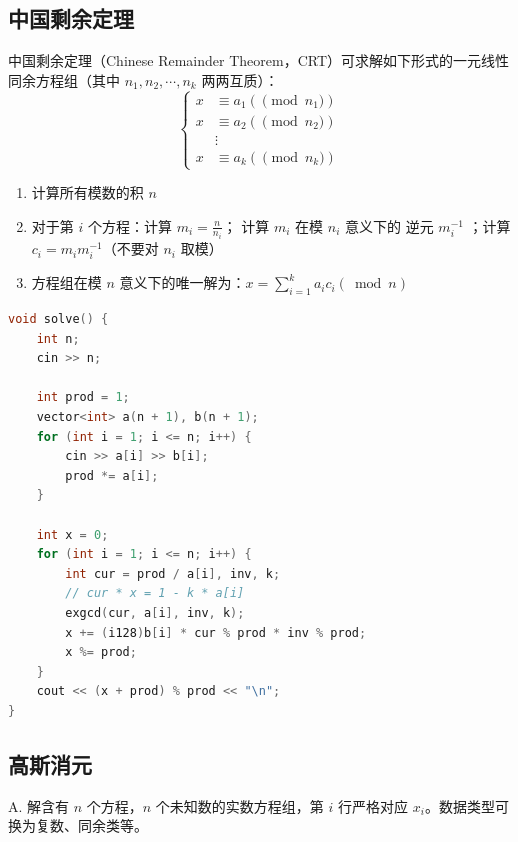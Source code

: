 \subsection{中国剩余定理}

中国剩余定理（Chinese Remainder Theorem，CRT）可求解如下形式的一元线性同余方程组（其中 $n_1, n_2, \cdots, n_k$ 两两互质）：
$$
\left\{\begin{aligned}
x & \equiv a_1\left(\pmod n_1\right) \\
x & \equiv a_2\left(\pmod n_2\right) \\
& \vdots \\
x & \equiv a_k\left(\pmod n_k\right)
\end{aligned}\right.
$$

\begin{enumerate}
    \item 计算所有模数的积 $n$ 
    \item 对于第 $i$ 个方程：计算 $m_i=\frac{n}{n_i}$； 计算 $m_i$ 在模 $n_i$ 意义下的 逆元 $m_i^{-1}$ ；计算 $c_i=m_i m_i^{-1}$（不要对 $n_i$ 取模）
    \item 方程组在模 $n$ 意义下的唯一解为：$x=\sum_{i=1}^k a_i c_i(\bmod n)$
\end{enumerate}

\begin{lstlisting}[language=C++]
void solve() {
    int n;
    cin >> n;
    
    int prod = 1;
    vector<int> a(n + 1), b(n + 1);
    for (int i = 1; i <= n; i++) {
        cin >> a[i] >> b[i];
        prod *= a[i];
    }

    int x = 0;
    for (int i = 1; i <= n; i++) {
        int cur = prod / a[i], inv, k;
        // cur * x = 1 - k * a[i]
        exgcd(cur, a[i], inv, k);
        x += (i128)b[i] * cur % prod * inv % prod;
        x %= prod;
    }
    cout << (x + prod) % prod << "\n";
}
\end{lstlisting}

\subsection{高斯消元}

A. 解含有 $n$ 个方程，$n$ 个未知数的实数方程组，第 $i$ 行严格对应 $x_i$。数据类型可换为复数、同余类等。

